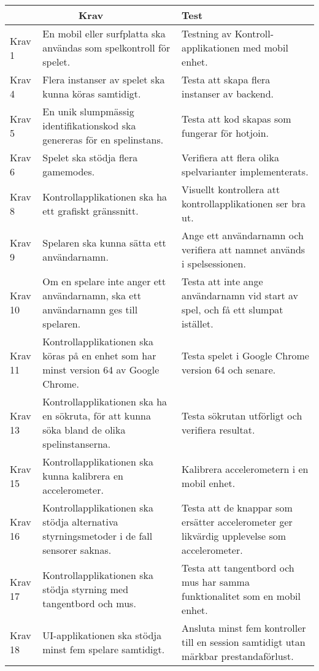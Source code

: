 	\begin{tabular}{| p{1.5cm} | p{6cm} | p{8cm}|}

  \hline
    \multicolumn{2}{|c|}{Krav}&{Test}\\
    \hline

		Krav 1&En mobil eller surfplatta ska användas som spelkontroll för spelet.&Testning av Kontroll-applikationen med mobil enhet.\\
		\hline
		Krav 4& Flera instanser av spelet ska kunna köras samtidigt. & Testa att skapa flera instanser av backend.\\
		\hline
		Krav 5& En unik slumpmässig identifikationskod ska genereras för en spelinstans. &Testa att kod skapas som fungerar för hotjoin.\\
		\hline
		Krav 6& Spelet ska stödja flera gamemodes. &Verifiera att flera olika spelvarianter implementerats.\\
		\hline
		Krav 8& Kontrollapplikationen ska ha ett grafiskt gränssnitt. &Visuellt kontrollera att kontrollapplikationen ser bra ut.\\
		\hline
		Krav 9& Spelaren ska kunna sätta ett användarnamn. &Ange ett användarnamn och verifiera att namnet används i spelsessionen.\\
		\hline
		Krav 10& Om en spelare inte anger ett användarnamn, ska ett användarnamn ges till spelaren. &Testa att inte ange användarnamn vid start av spel, och få ett slumpat istället. \\
		\hline
		Krav 11& Kontrollapplikationen ska köras på en enhet som har minst version 64 av Google Chrome. &Testa spelet i Google Chrome version 64 och senare.\\
		\hline
		Krav 13& Kontrollapplikationen ska ha en sökruta, för att kunna söka bland de olika spelinstanserna. &Testa sökrutan utförligt och verifiera resultat. \\
		\hline
		Krav 15& Kontrollapplikationen ska kunna kalibrera en accelerometer. &Kalibrera accelerometern i en mobil enhet.\\
		\hline
		Krav 16& Kontrollapplikationen ska stödja alternativa styrningsmetoder i de fall sensorer saknas. &Testa att de knappar som ersätter accelerometer ger likvärdig upplevelse som accelerometer.\\
		\hline
		Krav 17& Kontrollapplikationen ska stödja styrning med tangentbord och mus. &Testa att tangentbord och mus har samma funktionalitet som en mobil enhet.\\
		\hline
		Krav 18& UI-applikationen ska stödja minst fem spelare samtidigt. &Ansluta minst fem kontroller till en session samtidigt utan märkbar prestandaförlust.\\

\end{tabular}
